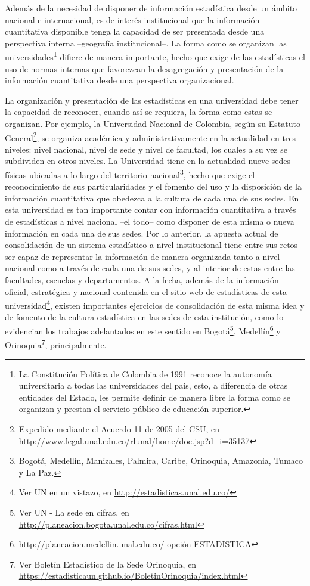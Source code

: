 \documentclass[
]{book}
\begin{document}
Además de la necesidad de disponer de información estadística desde un ámbito nacional e internacional, es de interés institucional que la información cuantitativa disponible tenga la capacidad de ser presentada desde una perspectiva interna --geografía institucional--. La forma como se organizan las universidades\footnote{La Constitución Política de Colombia de 1991 reconoce la autonomía universitaria a todas las universidades del país, esto, a diferencia de otras entidades del Estado, les permite definir de manera libre la forma como se organizan y prestan el servicio público de educación superior.} difiere de manera importante, hecho que exige de las estadísticas el uso de normas internas que favorezcan la desagregación y presentación de la información cuantitativa desde una perspectiva organizacional.

La organización y presentación de las estadísticas en una universidad debe tener la capacidad de reconocer, cuando así se requiera, la forma como estas se organizan. Por ejemplo, la Universidad Nacional de Colombia, según su Estatuto General\footnote{Expedido mediante el Acuerdo 11 de 2005 del CSU, en \url{http://www.legal.unal.edu.co/rlunal/home/doc.jsp?d_i=35137}}, se organiza académica y administrativamente en la actualidad en tres niveles: nivel nacional, nivel de sede y nivel de facultad, los cuales a su vez se subdividen en otros niveles. La Universidad tiene en la actualidad nueve sedes físicas ubicadas a lo largo del territorio nacional\footnote{Bogotá, Medellín, Manizales, Palmira, Caribe, Orinoquia, Amazonia, Tumaco y La Paz.}, hecho que exige el reconocimiento de sus particularidades y el fomento del uso y la disposición de la información cuantitativa que obedezca a la cultura de cada una de sus sedes. En esta universidad es tan importante contar con información cuantitativa a través de estadísticas a nivel nacional --el todo-- como disponer de esta misma o nueva información en cada una de sus sedes. Por lo anterior, la apuesta actual de consolidación de un sistema estadístico a nivel institucional tiene entre sus retos ser capaz de representar la información de manera organizada tanto a nivel nacional como a través de cada una de sus sedes, y al interior de estas entre las facultades, escuelas y departamentos. A la fecha, además de la información oficial, estratégica y nacional contenida en el sitio web de estadísticas de esta universidad\footnote{Ver UN en un vistazo, en \url{http://estadisticas.unal.edu.co/}}, existen importantes ejercicios de consolidación de esta misma idea y de fomento de la cultura estadística en las sedes de esta institución, como lo evidencian los trabajos adelantados en este sentido en Bogotá\footnote{Ver UN - La sede en cifras, en \url{http://planeacion.bogota.unal.edu.co/cifras.html}}, Medellín\footnote{\url{http://planeacion.medellin.unal.edu.co/} opción ESTADISTICA} y Orinoquia\footnote{Ver Boletín Estadístico de la Sede Orinoquia, en \url{https://estadisticaun.github.io/BoletinOrinoquia/index.html}}, principalmente.
\end{document}
